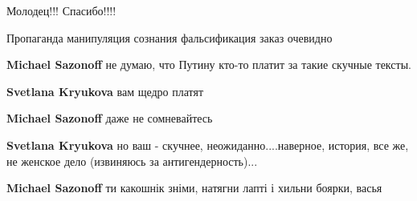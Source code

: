 \begin{itemize}
Молодец!!! Спасибо!!!!

 

Пропаганда манипуляция сознания фальсификация заказ очевидно

\begin{itemize}

 
\textbf{Michael Sazonoff} не думаю, что Путину кто-то платит за такие скучные тексты.

 
\textbf{Svetlana Kryukova} вам щедро платят

 
\textbf{Michael Sazonoff} даже не сомневайтесь

 
\textbf{Svetlana Kryukova} но ваш - скучнее, неожиданно....наверное, история, все же, не женское дело (извиняюсь за антигендерность)...

 
\textbf{Michael Sazonoff} \Smiley[1.0][yellow] ти какошнік зніми, натягни лапті і хильни боярки, васья


\end{itemize}
\end{itemize}

